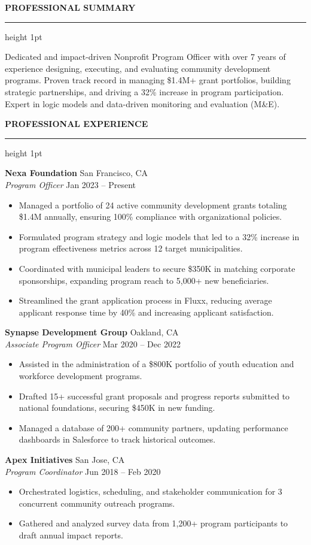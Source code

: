 \documentclass[10pt,oneside]{article}
\newcommand{\resumesection}[1]{%
  \vspace{0.6em}%
  {\color{primary}\MakeUppercase{\textbf{#1}}}%
  \vspace{0.2em}%
  {\color{primary}\hrule height 1pt}%
  \vspace{0.4em}%
}
\newcommand{\jobentry}[4]{%
  {\textbf{#1}} \hfill {\color{bodytext}#2} \\
  {\textit{#3}} \hfill {\small\color{bodytext}#4}
  \par\vspace{0.2em}
}
\begin{document}
\begin{minipage}[t]{0.62\textwidth}
  \resumesection{Professional Summary}
  Dedicated and impact-driven Nonprofit Program Officer with over 7 years of experience designing, executing, and evaluating community development programs. Proven track record in managing \$1.4M+ grant portfolios, building strategic partnerships, and driving a 32\% increase in program participation. Expert in logic models and data-driven monitoring and evaluation (M\&E).
  
  \vspace{0.8em}
  
  \resumesection{Professional Experience}
  
  \jobentry{Nexa Foundation}{San Francisco, CA}{Program Officer}{Jan 2023 -- Present}
  \begin{itemize}[leftmargin=1.0em, topsep=0.1em, itemsep=0.2em]
    \item Managed a portfolio of 24 active community development grants totaling \$1.4M annually, ensuring 100\% compliance with organizational policies.
    \item Formulated program strategy and logic models that led to a 32\% increase in program effectiveness metrics across 12 target municipalities.
    \item Coordinated with municipal leaders to secure \$350K in matching corporate sponsorships, expanding program reach to 5,000+ new beneficiaries.
    \item Streamlined the grant application process in Fluxx, reducing average applicant response time by 40\% and increasing applicant satisfaction.
  \end{itemize}
  
  \vspace{0.5em}
  
  \jobentry{Synapse Development Group}{Oakland, CA}{Associate Program Officer}{Mar 2020 -- Dec 2022}
  \begin{itemize}[leftmargin=1.0em, topsep=0.1em, itemsep=0.2em]
    \item Assisted in the administration of a \$800K portfolio of youth education and workforce development programs.
    \item Drafted 15+ successful grant proposals and progress reports submitted to national foundations, securing \$450K in new funding.
    \item Managed a database of 200+ community partners, updating performance dashboards in Salesforce to track historical outcomes.
  \end{itemize}
  
  \vspace{0.5em}
  
  \jobentry{Apex Initiatives}{San Jose, CA}{Program Coordinator}{Jun 2018 -- Feb 2020}
  \begin{itemize}[leftmargin=1.0em, topsep=0.1em, itemsep=0.2em]
    \item Orchestrated logistics, scheduling, and stakeholder communication for 3 concurrent community outreach programs.
    \item Gathered and analyzed survey data from 1,200+ program participants to draft annual impact reports.
  \end{itemize}
\end{minipage}%
\end{document}
